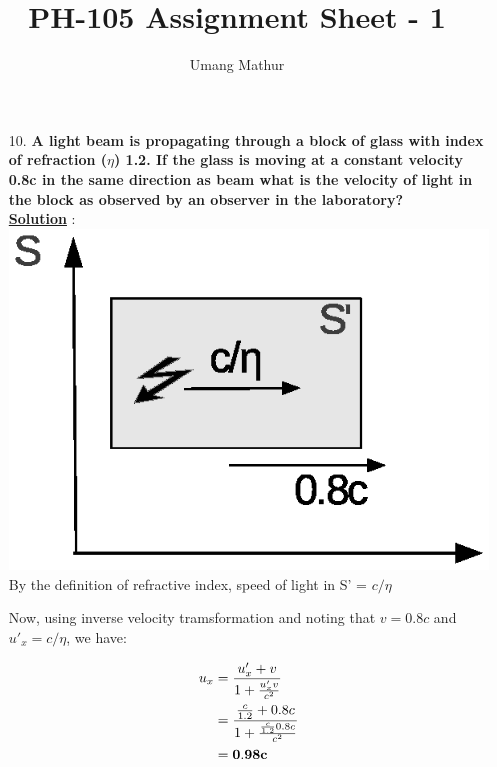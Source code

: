 \documentclass[10pt, a4paper]{article}
\begin{document}
\title{PH-105 Assignment Sheet - 1}
\date{}
\author{Umang Mathur}
\maketitle
\begin{enumerate}
\item[10.] {\bf A light beam is propagating through a block of glass with index of refraction ($\eta$) 1.2. If the glass is moving at a constant velocity 0.8c in the same direction as beam what is the velocity of light in the block as observed by an observer in the laboratory? }\\

{\underline {\bf Solution}} :\\
\includegraphics{fig2}\\
By the definition of refractive index, speed of light in S' = $c/\eta$

Now, using inverse velocity tramsformation and noting that $v = 0.8c$ and $u'_{x} = c/\eta$, we have:

\begin{align*}
	u_{x} &= \frac{u'_{x} + v}{1 + \frac{u'_{x}v}{c^{2}}}\\
	&= \frac{\frac{c}{1.2} + 0.8c}{1 + \frac{\frac{c}{1.2}0.8c}{c^{2}}}\\
	&= {\bf 0.98c}
\end{align*}

\end{enumerate}
\end{document}
